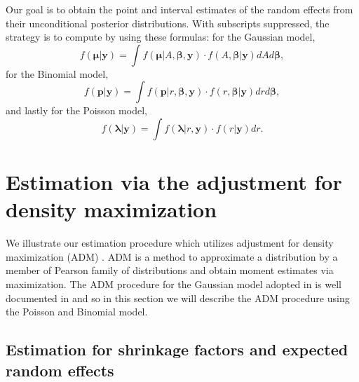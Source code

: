 \documentclass[article]{jss}
\begin{document}
Our goal is to obtain the point and interval estimates of the random effects from their unconditional posterior distributions. With subscripts suppressed, the strategy is to compute by using these formulas:  for the Gaussian  model, 
\begin{equation}\label{mcintegration_normal}
f(\boldsymbol{\mu}\vert \boldsymbol{y})=\int  f(\boldsymbol{\mu}\vert A, \boldsymbol{\beta}, \boldsymbol{y})\cdot f(A, \boldsymbol{\beta}\vert \boldsymbol{y})dA d\boldsymbol{\beta},
\end{equation}
for the Binomial  model, 
\begin{equation}\label{mcintegration_binomial}
f(\boldsymbol{p}\vert \boldsymbol{y})=\int  f(\boldsymbol{p}\vert r, \boldsymbol{\beta}, \boldsymbol{y})\cdot f(r, \boldsymbol{\beta}\vert \boldsymbol{y})dr d\boldsymbol{\beta},
\end{equation}
and lastly for the Poisson  model, 
\begin{equation}\label{mcintegration_poisson}
f(\boldsymbol{\lambda}\vert \boldsymbol{y})=\int  f(\boldsymbol{\lambda}\vert r, \boldsymbol{y})\cdot f(r\vert \boldsymbol{y})dr.
\end{equation}




\section[Estimation]{Estimation via the adjustment for density maximization}\label{sec3}



We illustrate our estimation procedure which utilizes adjustment for density maximization (ADM) \citep{carl1988, morris1997, tang2011}. ADM is a method  to  approximate a distribution by a member of Pearson family of distributions and obtain moment estimates via maximization. The ADM procedure for the Gaussian model adopted in  is well documented in \cite{kelly2014advances} and so in this section we will describe  the ADM procedure  using the Poisson and Binomial model. 

\subsection[shrinkage]{Estimation for shrinkage factors and expected random effects}\label{shrinkage}
\end{document}
